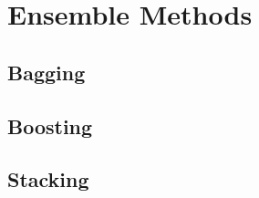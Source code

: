 \section{Ensemble Methods}



\subsection{Bagging}



\subsection{Boosting}



\subsection{Stacking}


\newpage
